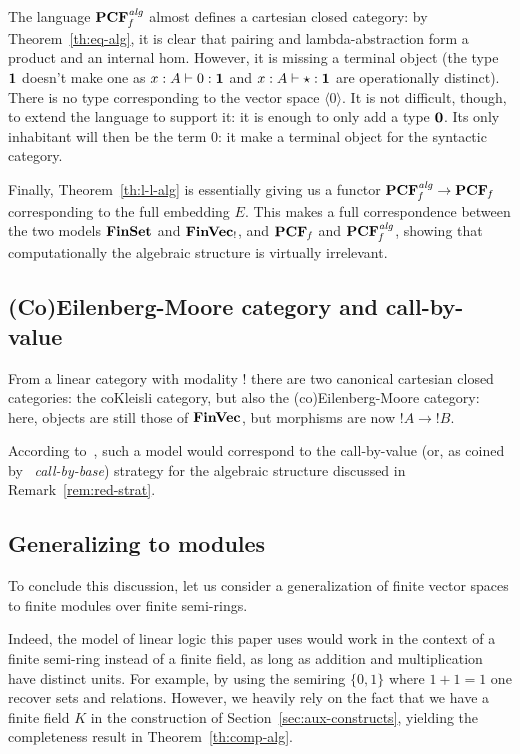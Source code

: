 \documentclass[10pt]{article}
\theoremstyle{plain}
\theoremstyle{definition}
\newcommand{\FinSet}{\mbox{\bf FinSet}}
\newcommand{\FinVec}{\mbox{\bf FinVec}}
\newcommand{\tunit}{{\bf 1}}
\newcommand{\bottype}{{\bf 0}}
\begin{document}
The language ${\bf PCF}_{\it f}^{\it alg}$ almost defines a cartesian closed category: by
Theorem~\ref{th:eq-alg}, it is clear that pairing and lambda-abstraction form a
product and an internal hom. However, it is missing a terminal object
(the type $\tunit$ doesn't make one as $x:A\vdash 0:\tunit$ and
$x:A\vdash \star:\tunit$ are operationally distinct). There is no type
corresponding to the vector space $\langle0\rangle$. It is not
difficult, though, to extend
the language to support it: it is enough to only add a type $\bottype$. Its only
inhabitant will then be the term $0$: it make a terminal
object for the syntactic
category.

Finally, Theorem~\ref{th:l-l-alg} is essentially giving us a functor
${\bf PCF}_{\it f}^{\it alg}\to{{\bf PCF}_{\it f}}$ corresponding to the full embedding
$E$. This makes
a full correspondence between the two models $\FinSet$ and $\FinVec_!$, and
${\bf PCF}_{\it f}$ and ${\bf PCF}_{\it f}^{\it alg}$, showing that computationally the algebraic
structure is virtually irrelevant.




\subsection{(Co)Eilenberg-Moore category and call-by-value}
\label{sec:call-value-reduction}


From a linear category with modality $!$ there are two canonical cartesian
closed categories: the coKleisli category, but also the (co)Eilenberg-Moore
category: here, objects are still those of ${\FinVec}$, but morphisms
are now ${!A}\to{!B}$.

According to~\cite{valiron13typed}, such a model would correspond to
the call-by-value (or, as coined by~\cite{diazcaro-phd} {\em call-by-base})
strategy for the algebraic structure discussed in
Remark~\ref{rem:red-strat}.


\subsection{Generalizing to modules}
\label{sec:generalizing-modules}

To conclude this discussion, let us consider a generalization of finite vector
spaces to finite modules over finite semi-rings.

Indeed, the model of linear logic this paper uses would work in the context of a
finite semi-ring instead of a finite field, as long as addition and
multiplication have distinct units. For example, by using the
semiring $\{0,1\}$ where $1+1=1$ one recover sets and relations.
However, we heavily rely on the fact
that we have a finite field $K$ in the construction of
Section~\ref{sec:aux-constructs}, yielding the completeness result in
Theorem~\ref{th:comp-alg}.
\end{document}
